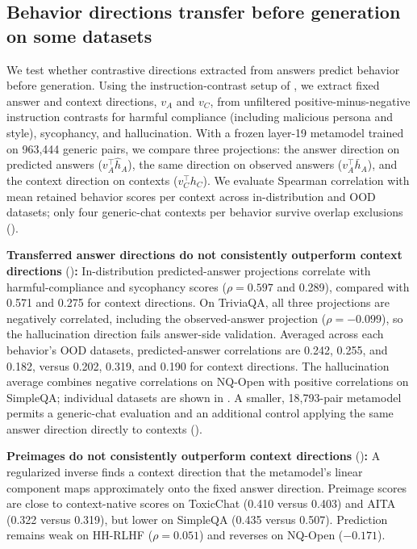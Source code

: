 \subsection{Behavior directions transfer before generation on some datasets}
\label{sec:results-behavior}

We test whether contrastive directions extracted from answers predict behavior before generation. Using the instruction-contrast setup of \citet{chen2025personavectors}, we extract fixed answer and context directions, $v_A$ and $v_C$, from unfiltered positive-minus-negative instruction contrasts for harmful compliance (including malicious persona and style), sycophancy, and hallucination. With a frozen layer-19 metamodel trained on 963,444 generic pairs, we compare three projections: the answer direction on predicted answers ($v_A^\top\hat h_A$), the same direction on observed answers ($v_A^\top\bar h_A$), and the context direction on contexts ($v_C^\top h_C$). We evaluate Spearman correlation with mean retained behavior scores per context across in-distribution and OOD datasets; only four generic-chat contexts per behavior survive overlap exclusions ().

\noindent\textbf{Transferred answer directions do not consistently outperform context directions} ()\textbf{:} In-distribution predicted-answer projections correlate with harmful-compliance and sycophancy scores ($\rho=0.597$ and 0.289), compared with 0.571 and 0.275 for context directions. On TriviaQA, all three projections are negatively correlated, including the observed-answer projection ($\rho=-0.099$), so the hallucination direction fails answer-side validation. Averaged across each behavior's OOD datasets, predicted-answer correlations are 0.242, 0.255, and 0.182, versus 0.202, 0.319, and 0.190 for context directions. The hallucination average combines negative correlations on NQ-Open with positive correlations on SimpleQA; individual datasets are shown in . A smaller, 18,793-pair metamodel permits a generic-chat evaluation and an additional control applying the same answer direction directly to contexts ().

\noindent\textbf{Preimages do not consistently outperform context directions} ()\textbf{:} A regularized inverse finds a context direction that the metamodel's linear component maps approximately onto the fixed answer direction. Preimage scores are close to context-native scores on ToxicChat (0.410 versus 0.403) and AITA (0.322 versus 0.319), but lower on SimpleQA (0.435 versus 0.507). Prediction remains weak on HH-RLHF ($\rho=0.051$) and reverses on NQ-Open ($-0.171$).

